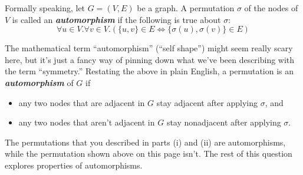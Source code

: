 \documentclass{article}
\renewcommand{\(}{\left(}
\renewcommand{\)}{\right)}
\theoremstyle{plain}
\theoremstyle{plain}
\theoremstyle{definition}
\renewcommand{\emph}[1]{\textit{\textbf{#1}}}
\begin{document}
Formally speaking, let $G = (V, E)$ be a graph. A permutation $\sigma$ of the nodes of $V$ is called an \emph{automorphism} if the following is true about $\sigma$:
$$\forall u \in V. \forall v \in V . (\{u, v\} \in E \iff \{\sigma(u), \sigma(v)\} \in E)$$

The mathematical term ``automorphism'' (``self shape'') might seem really scary here, but it's just a fancy way of pinning down what we've been describing with the term ``symmetry.'' Restating the above in plain English, a permutation is an \emph{automorphism} of $G$ if
\begin{itemize}
    \item any two nodes that are adjacent in $G$ stay adjacent after applying $\sigma$, and
    \item any two nodes that aren't adjacent in $G$ stay nonadjacent after applying $\sigma$.
\end{itemize}

The permutations that you described in parts (i) and (ii) are automorphisms, while the permutation shown above on this page isn't. The rest of this question explores properties of automorphisms.
\end{document}
